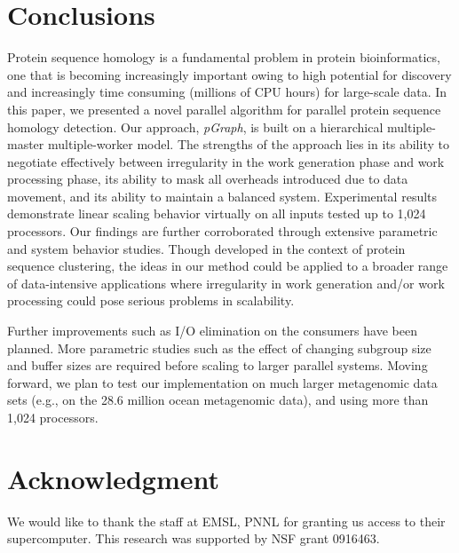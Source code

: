 \documentclass[10pt,journal,letterpaper,compsoc]{IEEEtran}
\begin{document}
\section{Conclusions}
\label{secConclusions}

Protein sequence homology is a fundamental problem in protein bioinformatics, one that is becoming increasingly important owing to high potential for discovery and increasingly time consuming (millions of CPU hours) for large-scale data. In this paper, we presented a novel parallel algorithm for parallel protein sequence homology detection. Our approach, {\it pGraph}, is built on a hierarchical multiple-master multiple-worker model. The strengths of the approach lies in its ability to negotiate effectively between irregularity in the work generation phase and work processing phase, its ability to mask all overheads introduced due to data movement, and its ability to maintain a balanced system. Experimental results demonstrate linear scaling behavior virtually on all inputs tested up to 1,024 processors. Our findings are further corroborated through extensive parametric and system behavior studies. Though developed in the context of protein sequence clustering, the ideas in our method could be applied to a broader range of data-intensive applications where irregularity in work generation and/or work processing could pose serious problems in scalability. 

Further improvements such as I/O elimination on the consumers have been planned. More parametric studies such as the effect of changing subgroup size and buffer sizes are required before scaling to larger parallel systems. Moving forward, we plan to test our implementation on much larger metagenomic data sets (e.g., on the 28.6 million ocean metagenomic data), and using more than 1,024 processors. 

\section*{Acknowledgment}
We would like to thank the staff at EMSL, PNNL for granting us access to their supercomputer. This research was supported by NSF grant 0916463.



\end{document}
